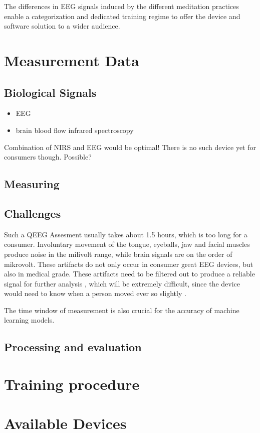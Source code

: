 \documentclass{llncs} %
\begin{document}
The differences in EEG signals induced by the different meditation practices enable a categorization
and dedicated training regime to offer the device and software solution to a wider audience. \cite{Travis}
\section{Measurement Data}
\subsection{Biological Signals}
\begin{itemize}
    \item EEG
    \item brain blood flow infrared spectroscopy
\end{itemize}
Combination of NIRS and EEG would be optimal! There is no such device yet for consumers though.
Possible?

\subsection{Measuring}
\subsection{Challenges}
Such a QEEG Assesment usually takes about 1.5 hours, which is too long for a consumer.
Involuntary movement of the tongue, eyeballs, jaw and facial muscles produce noise in the milivolt range, while brain signals are on 
the order of mikrovolt. These artifacts do not only occur in consumer great EEG devices, but also in medical grade.
These artifacts need to be filtered out to produce a reliable signal for further analysis \cite{Bashivan: et al}, which will be extremely difficult, since the device would need to know when a person moved ever so slightly \cite{Hammond}.

The time window of measurement is also crucial for the accuracy of machine learning models.
\subsection{Processing and evaluation}
\cite{Lotte}
\section{Training procedure}
\section{Available Devices}
\end{document}
